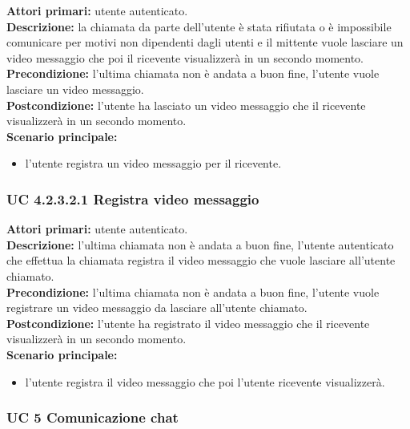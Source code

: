 \noindent
\textbf{Attori primari:} utente autenticato.\\
\textbf{Descrizione:} la chiamata da parte dell'utente è stata rifiutata o è impossibile comunicare per motivi non dipendenti dagli utenti e il mittente vuole lasciare un video messaggio che poi il ricevente visualizzerà in un secondo momento.\\
\textbf{Precondizione:} l'ultima chiamata non è andata a buon fine, l'utente vuole lasciare un video messaggio.\\
\textbf{Postcondizione:} l'utente ha lasciato un video messaggio che il ricevente visualizzerà in un secondo momento.\\
\textbf{Scenario principale:}
\begin{itemize}
\item l'utente registra un video messaggio per il ricevente.
\end{itemize}

\subsubsection{UC 4.2.3.2.1 Registra video messaggio}
\noindent
\textbf{Attori primari:} utente autenticato.\\
\textbf{Descrizione:} l'ultima chiamata non è andata a buon fine, l'utente autenticato che effettua la chiamata registra il video messaggio che vuole lasciare all'utente chiamato.\\
\textbf{Precondizione:} l'ultima chiamata non è andata a buon fine, l'utente vuole registrare un video messaggio da lasciare all'utente chiamato.\\
\textbf{Postcondizione:} l'utente ha registrato il video messaggio che il ricevente visualizzerà in un secondo momento.\\
\textbf{Scenario principale:}
\begin{itemize}
\item l'utente registra il video messaggio che poi l'utente ricevente visualizzerà.
\end{itemize}

\newpage

\subsubsection{UC 5 Comunicazione chat}

